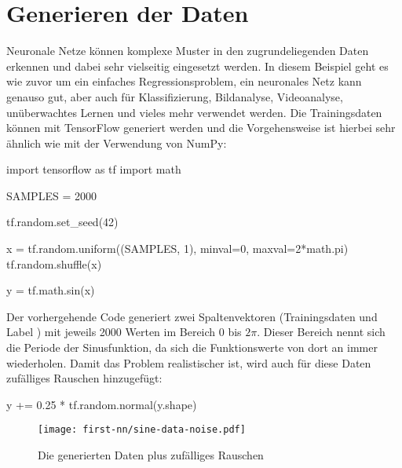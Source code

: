 \section{Generieren der Daten}
Neuronale Netze können komplexe Muster in den zugrundeliegenden Daten erkennen
und dabei sehr vielseitig eingesetzt werden.
In diesem Beispiel geht es wie zuvor um ein einfaches Regressionsproblem,
ein neuronales Netz kann genauso gut, aber auch für
Klassifizierung, Bildanalyse, Videoanalyse, unüberwachtes Lernen und vieles mehr verwendet werden.
Die Trainingsdaten können mit TensorFlow generiert werden und
die Vorgehensweise ist hierbei sehr ähnlich wie mit der Verwendung von NumPy:
\begin{pythoncode}
import tensorflow as tf
import math

SAMPLES = 2000

tf.random.set_seed(42)

x = tf.random.uniform((SAMPLES, 1), minval=0, maxval=2*math.pi)
tf.random.shuffle(x)

y = tf.math.sin(x)
\end{pythoncode}
Der vorhergehende Code generiert zwei Spaltenvektoren
(Trainingsdaten  und Label )
mit jeweils 2000 Werten im Bereich 0 bis $2\pi$.
Dieser Bereich nennt sich die Periode der Sinusfunktion,
da sich die Funktionswerte von dort an immer wiederholen.
Damit das Problem realistischer ist, wird auch für diese Daten
zufälliges Rauschen hinzugefügt:
\begin{pythoncode}
y += 0.25 * tf.random.normal(y.shape)
\end{pythoncode}
\begin{figure}[h!]
  \centering
  \texttt{[image: first-nn/sine-data-noise.pdf]}
  \caption{Die generierten Daten plus zufälliges Rauschen}
\end{figure}

